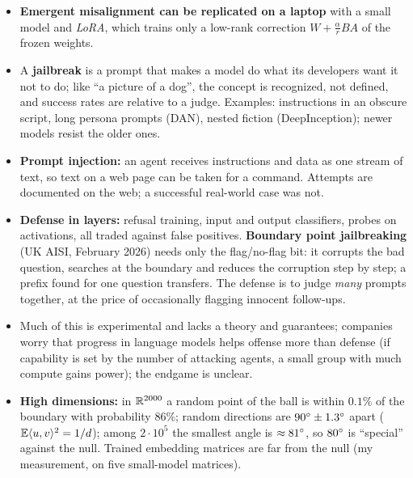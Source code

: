 \begin{takeaways}
\begin{itemize}
  \item \textbf{Emergent misalignment can be replicated on a laptop} with a small model and \emph{LoRA}, which trains only a low-rank correction $W+\tfrac{\alpha}{r}BA$ of the frozen weights.
  \item A \textbf{jailbreak} is a prompt that makes a model do what its developers want it not to do; like ``a picture of a dog'', the concept is recognized, not defined, and success rates are relative to a judge. Examples: instructions in an obscure script, long persona prompts (DAN), nested fiction (DeepInception); newer models resist the older ones.
  \item \textbf{Prompt injection:} an agent receives instructions and data as one stream of text, so text on a web page can be taken for a command. Attempts are documented on the web; a successful real-world case was not.
  \item \textbf{Defense in layers:} refusal training, input and output classifiers, probes on activations, all traded against false positives. \textbf{Boundary point jailbreaking} (UK AISI, February 2026) needs only the flag/no-flag bit: it corrupts the bad question, searches at the boundary and reduces the corruption step by step; a prefix found for one question transfers. The defense is to judge \emph{many} prompts together, at the price of occasionally flagging innocent follow-ups.
  \item Much of this is experimental and lacks a theory and guarantees; companies worry that progress in language models helps offense more than defense (if capability is set by the number of attacking agents, a small group with much compute gains power); the endgame is unclear.
  \item \textbf{High dimensions:} in $\mathbb{R}^{2000}$ a random point of the ball is within $0.1\%$ of the boundary with probability $86\%$; random directions are $90^{\circ}\pm1.3^{\circ}$ apart ($\mathbb{E}\langle u,v\rangle^2=1/d$); among $2\cdot10^5$ the smallest angle is $\approx81^{\circ}$, so $80^{\circ}$ is ``special'' against the null. Trained embedding matrices are far from the null (my measurement, on five small-model matrices).
\end{itemize}
\end{takeaways}

